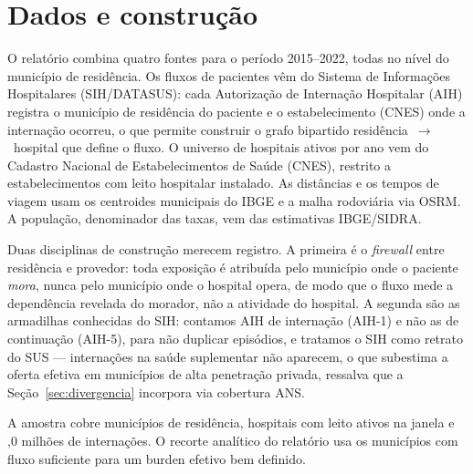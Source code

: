 
\section{Dados e construção}
\label{sec:dados}

O relatório combina quatro fontes para o período 2015--2022, todas no nível do
município de residência. Os fluxos de pacientes vêm do Sistema de Informações
Hospitalares (SIH/DATASUS): cada Autorização de Internação Hospitalar (AIH)
registra o município de residência do paciente e o estabelecimento (CNES) onde a
internação ocorreu, o que permite construir o grafo bipartido
residência~$\rightarrow$~hospital que define o fluxo. O universo de hospitais
ativos por ano vem do Cadastro Nacional de Estabelecimentos de Saúde (CNES),
restrito a estabelecimentos com leito hospitalar instalado. As distâncias e os
tempos de viagem usam os centroides municipais do IBGE e a malha rodoviária via
OSRM. A população, denominador das taxas, vem das estimativas IBGE/SIDRA.

Duas disciplinas de construção merecem registro. A primeira é o \emph{firewall}
entre residência e provedor: toda exposição é atribuída pelo município onde o
paciente \emph{mora}, nunca pelo município onde o hospital opera, de modo que o
fluxo mede a dependência revelada do morador, não a atividade do hospital. A
segunda são as armadilhas conhecidas do SIH: contamos AIH de internação (AIH-1)
e não as de continuação (AIH-5), para não duplicar episódios, e tratamos o SIH
como retrato do SUS --- internações na saúde suplementar não aparecem, o que
subestima a oferta efetiva em municípios de alta penetração privada, ressalva
que a Seção~\ref{sec:divergencia} incorpora via cobertura ANS.

A amostra cobre \valNmunRes{} municípios de residência, \valNhosp{} hospitais com
leito ativos na janela e \valNaih,0 milhões de internações.%
O recorte analítico do relatório usa os \valNmunic{} municípios com fluxo
suficiente para um burden efetivo bem definido.%

